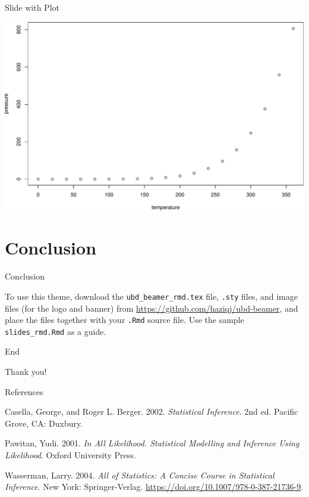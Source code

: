 \documentclass[,]{beamer}
\begin{document}
\begin{frame}{Slide with Plot}
\protect\hypertarget{slide-with-plot}{}

\includegraphics{slides_rmd_files/figure-beamer/pressure-1.pdf}

\end{frame}

\hypertarget{conclusion}{%
\section{Conclusion}\label{conclusion}}

\begin{frame}[fragile]{Conclusion}
\protect\hypertarget{conclusion-1}{}

To use this theme, download the \texttt{ubd\_beamer\_rmd.tex} file,
\texttt{.sty} files, and image files (for the logo and banner) from
\url{https://github.com/haziqj/ubd-beamer}, and place the files together
with your \texttt{.Rmd} source file. Use the sample
\texttt{slides\_rmd.Rmd} as a guide.

\end{frame}

\begin{frame}{End}
\protect\hypertarget{end}{}

\centering

\Huge Thank you!

\end{frame}

\begin{frame}{References}
\protect\hypertarget{references}{}

\hypertarget{refs}{}
\leavevmode\hypertarget{ref-casella2002statistical}{}%
Casella, George, and Roger L. Berger. 2002. \emph{Statistical
Inference}. 2nd ed. Pacific Grove, CA: Duxbury.

\leavevmode\hypertarget{ref-pawitan2001all}{}%
Pawitan, Yudi. 2001. \emph{In All Likelihood. Statistical Modelling and
Inference Using Likelihood}. Oxford University Press.

\leavevmode\hypertarget{ref-wasserman2013all}{}%
Wasserman, Larry. 2004. \emph{All of Statistics: A Concise Course in
Statistical Inference}. New York: Springer-Verlag.
\url{https://doi.org/10.1007/978-0-387-21736-9}.

\end{frame}


% 
\end{document}
